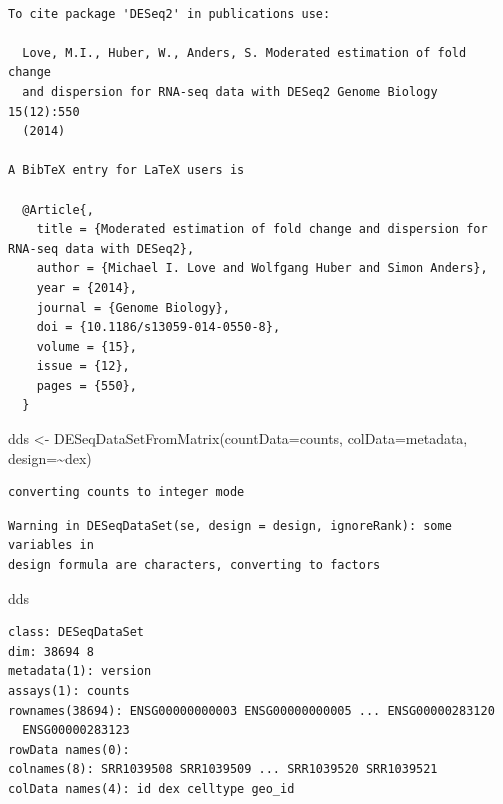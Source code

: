 \documentclass[
  letterpaper,
  DIV=11,
  numbers=noendperiod]{scrartcl}
\newenvironment{Shaded}{\begin{snugshade}}{\end{snugshade}}
\newcommand{\AttributeTok}[1]{\textcolor[rgb]{0.40,0.45,0.13}{#1}}
\newcommand{\FunctionTok}[1]{\textcolor[rgb]{0.28,0.35,0.67}{#1}}
\newcommand{\NormalTok}[1]{\textcolor[rgb]{0.00,0.23,0.31}{#1}}
\newcommand{\OtherTok}[1]{\textcolor[rgb]{0.00,0.23,0.31}{#1}}
\newcommand{\SpecialCharTok}[1]{\textcolor[rgb]{0.37,0.37,0.37}{#1}}
\begin{document}
\begin{verbatim}

To cite package 'DESeq2' in publications use:

  Love, M.I., Huber, W., Anders, S. Moderated estimation of fold change
  and dispersion for RNA-seq data with DESeq2 Genome Biology 15(12):550
  (2014)

A BibTeX entry for LaTeX users is

  @Article{,
    title = {Moderated estimation of fold change and dispersion for RNA-seq data with DESeq2},
    author = {Michael I. Love and Wolfgang Huber and Simon Anders},
    year = {2014},
    journal = {Genome Biology},
    doi = {10.1186/s13059-014-0550-8},
    volume = {15},
    issue = {12},
    pages = {550},
  }
\end{verbatim}

\begin{Shaded}
\begin{Highlighting}[]
\NormalTok{dds }\OtherTok{\textless{}{-}} \FunctionTok{DESeqDataSetFromMatrix}\NormalTok{(}\AttributeTok{countData=}\NormalTok{counts, }
                              \AttributeTok{colData=}\NormalTok{metadata, }
                              \AttributeTok{design=}\SpecialCharTok{\textasciitilde{}}\NormalTok{dex)}
\end{Highlighting}
\end{Shaded}

\begin{verbatim}
converting counts to integer mode
\end{verbatim}

\begin{verbatim}
Warning in DESeqDataSet(se, design = design, ignoreRank): some variables in
design formula are characters, converting to factors
\end{verbatim}

\begin{Shaded}
\begin{Highlighting}[]
\NormalTok{dds}
\end{Highlighting}
\end{Shaded}

\begin{verbatim}
class: DESeqDataSet 
dim: 38694 8 
metadata(1): version
assays(1): counts
rownames(38694): ENSG00000000003 ENSG00000000005 ... ENSG00000283120
  ENSG00000283123
rowData names(0):
colnames(8): SRR1039508 SRR1039509 ... SRR1039520 SRR1039521
colData names(4): id dex celltype geo_id
\end{verbatim}
\end{document}
